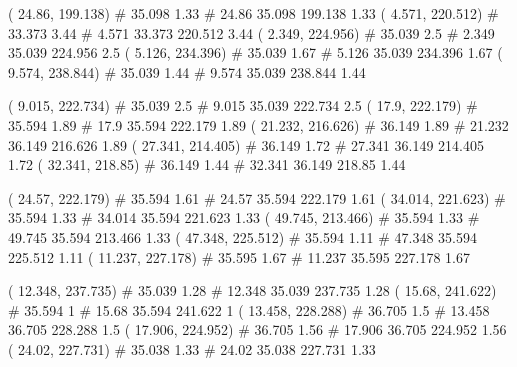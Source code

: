 \documentclass[a4paper,openbib,10pt]{article}
\newenvironment{treegraph}{\begin{graph}}{\end{graph}}
\begin{document}
\begin{treegraph}
  ( 24.86, 199.138) #     35.098    1.33
   #    24.86    35.098    199.138    1.33
  ( 4.571, 220.512) #     33.373    3.44
   #    4.571    33.373    220.512    3.44
  ( 2.349, 224.956) #     35.039    2.5
   #    2.349    35.039    224.956    2.5
  ( 5.126, 234.396) #     35.039    1.67
   #    5.126    35.039    234.396    1.67
  ( 9.574, 238.844) #     35.039    1.44
   #    9.574    35.039    238.844    1.44

  ( 9.015, 222.734) #     35.039    2.5
   #    9.015    35.039    222.734    2.5
  ( 17.9, 222.179) #     35.594    1.89
   #    17.9    35.594    222.179    1.89
  ( 21.232, 216.626) #     36.149    1.89
   #    21.232    36.149    216.626    1.89
  ( 27.341, 214.405) #     36.149    1.72
   #    27.341    36.149    214.405    1.72
  ( 32.341, 218.85) #     36.149    1.44
   #    32.341    36.149    218.85    1.44

  ( 24.57, 222.179) #     35.594    1.61
   #    24.57    35.594    222.179    1.61
  ( 34.014, 221.623) #     35.594    1.33
   #    34.014    35.594    221.623    1.33
  ( 49.745, 213.466) #     35.594    1.33
   #    49.745    35.594    213.466    1.33
  ( 47.348, 225.512) #     35.594    1.11
   #    47.348    35.594    225.512    1.11
  ( 11.237, 227.178) #     35.595    1.67
   #    11.237    35.595    227.178    1.67

  ( 12.348, 237.735) #     35.039    1.28
   #    12.348    35.039    237.735    1.28
  ( 15.68, 241.622) #     35.594    1
   #    15.68    35.594    241.622    1
  ( 13.458, 228.288) #     36.705    1.5
   #    13.458    36.705    228.288    1.5
  ( 17.906, 224.952) #     36.705    1.56
   #    17.906    36.705    224.952    1.56
  ( 24.02, 227.731) #     35.038    1.33
   #    24.02    35.038    227.731    1.33


\end{treegraph}
\end{document}
